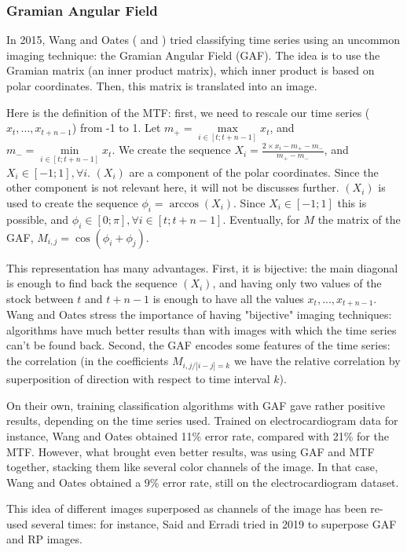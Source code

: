 \documentclass[11pt]{article}
\begin{document}
\begin{onehalfspace}
\subsubsection{Gramian Angular Field}
\label{gaf}

In 2015, Wang and Oates (\cite{wang_encod} and \cite{wang}) tried classifying time series using an uncommon imaging technique: the Gramian Angular Field (GAF). The idea is to use the Gramian matrix (an inner product matrix), which inner product is based on polar coordinates. Then, this matrix is translated into an image. 

Here is the definition of the MTF: first, we need to rescale our time series ($x_t, ..., x_{t+n-1}$) from -1 to 1. Let $m_+ = \max\limits_{i \in [t; t+n-1]} x_t$, and $m_- = \min\limits_{i \in [t; t+n-1]} x_t$. We create the sequence $X_i = \frac{2 \times x_i - m_+ - m_-}{m_+ - m_-}$, and $X_i \in [-1;1], \forall i$. $(X_i)$ are a component of the polar coordinates. Since the other component is not relevant here, it will not be discusses further. $(X_i)$ is used to create the sequence $\phi_i = \arccos(X_i)$. Since $X_i \in [-1;1]$ this is possible, and $\phi_i \in [0;\pi], \forall i \in [t;t+n-1]$. Eventually, for $M$ the matrix of the GAF, $M_{i,j} = \cos(\phi_i + \phi_j)$.

This representation has many advantages. First, it is bijective: the main diagonal is enough to find back the sequence $(X_i)$, and having only two values of the stock between $t$ and $t+n-1$ is enough to have all the values $x_t, ..., x_{t+n-1}$. Wang and Oates stress the importance of having "bijective" imaging techniques: algorithms have much better results than with images with which the time series can't be found back. Second, the GAF encodes some features of the time series: the correlation (in the coefficients $M_{i,j / |i-j| = k}$ we have the relative correlation by superposition of direction with respect to time interval $k$).

On their own, training classification algorithms with GAF gave rather positive results, depending on the time series used. Trained on electrocardiogram data for instance, Wang and Oates \cite{wang_encod} obtained 11\% error rate, compared with 21\% for the MTF. However, what brought even better results, was using GAF and MTF together, stacking them like several color channels of the image. In that case, Wang and Oates \cite{wang} obtained a 9\% error rate, still on the electrocardiogram dataset.

This idea of different images superposed as channels of the image has been re-used several times: for instance, Said and Erradi tried in 2019 \cite{said} to superpose GAF and RP images.


\end{onehalfspace}
\end{document}

